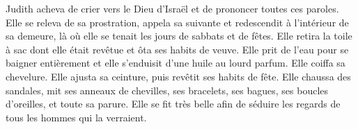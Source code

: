 Judith acheva de crier vers le Dieu d’Israël et de prononcer toutes ces paroles.
Elle se releva de sa prostration, appela sa suivante
	et redescendit à l’intérieur de sa demeure,
	là où elle se tenait les jours de sabbats et de fêtes.
Elle retira la toile à sac dont elle était revêtue et ôta ses habits de veuve.
Elle prit de l’eau pour se baigner entièrement
	et elle s’enduisit d’une huile au lourd parfum.
Elle coiffa sa chevelure.
	Elle ajusta sa ceinture, puis revêtit ses habits de fête.
Elle chaussa des sandales, mit ses anneaux de chevilles,
	ses bracelets, ses bagues, ses boucles d’oreilles, et toute sa parure.
Elle se fit très belle afin de séduire les regards de tous les hommes qui la verraient.
